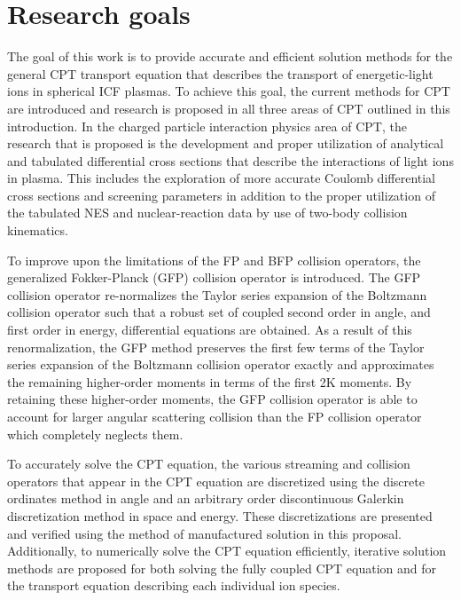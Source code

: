 \documentclass[../main.tex]{subfiles}
\begin{document}
\section{Research goals}
The goal of this work is to provide accurate and efficient solution methods for the general CPT transport equation that describes the transport of energetic-light ions in spherical ICF plasmas. To achieve this goal, the current methods for CPT are introduced and research is proposed in all three areas of CPT outlined in this introduction. In the charged particle interaction physics area of CPT, the research that is proposed is the development and proper utilization of analytical and tabulated differential cross sections that describe the interactions of light ions in plasma. This includes the exploration of more accurate Coulomb differential cross sections and screening parameters in addition to the proper utilization of the tabulated NES and nuclear-reaction data by use of two-body collision kinematics.

To improve upon the limitations of the FP and BFP collision operators, the generalized Fokker-Planck (GFP) collision operator is introduced. The GFP collision operator re-normalizes the Taylor series expansion of the Boltzmann collision operator such that a robust set of coupled second order in angle, and first order in energy, differential equations are obtained. As a result of this renormalization, the GFP method preserves the first few terms of the Taylor series expansion of the Boltzmann collision operator exactly and approximates the remaining higher-order moments in terms of the first 2K moments. By retaining these higher-order moments, the GFP collision operator is able to account for larger angular scattering collision than the FP collision operator which completely neglects them.

To accurately solve the CPT equation, the various streaming and collision operators that appear in the CPT equation are discretized using the discrete ordinates \Sn method in angle and an arbitrary order discontinuous Galerkin discretization method in space and energy. These discretizations are presented and verified using the method of manufactured solution in this proposal. Additionally, to numerically solve the CPT equation efficiently, iterative solution methods are proposed for both solving the fully coupled CPT equation and for the transport equation describing each individual ion species.
\end{document}
